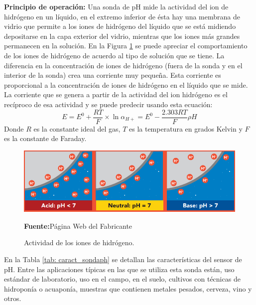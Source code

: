 \textbf{Principio de operación: }Una sonda de pH mide la actividad del ion de hidrógeno en un líquido, en el extremo inferior de ésta hay una membrana de vidrio que permite a los iones de hidrógeno del líquido que se está midiendo depositarse en la capa exterior del vidrio, mientras que los iones más grandes permanecen en la solución. En la Figura \ref{fig:phGrafico} se puede apreciar el comportamiento de los iones de hidrógeno de acuerdo al tipo de solución que se tiene. La diferencia en la concentración de iones de hidrógeno (fuera de la sonda y en el interior de la sonda) crea una corriente muy pequeña. Esta corriente es proporcional a la concentración de iones de hidrógeno en el líquido que se mide.
La corriente que se genera a partir de la actividad del ion hidrógeno es el recíproco de esa actividad y se puede predecir usando esta ecuación:
\begin{equation}
E=E^0 + \frac{RT}{F}\times \ln\alpha_{H+} = E^0 - \frac{2.303RT}{F}\rho H
\label{eq:iv}
\end{equation}
Donde $R$ es la constante ideal del gas, $T$ es la temperatura en grados Kelvin y $F$ es la constante de Faraday.
\newline
\hfill
\begin{figure}[H]
\centering
	\includegraphics[width=\textwidth]{Imagenes/2021/imag22.png}%
	\caption[Actividad de los iones de hidrógeno]{Actividad de los iones de hidrógeno.  }{\textbf{Fuente:}P\'agina Web del Fabricante \cite{atlasph}}
	\label{fig:phGrafico}
\end{figure}

En la Tabla \ref{tab: caract_sondaph} se detallan las características del sensor de pH.
\newline
\hfill
Entre las aplicaciones típicas en las que se utiliza esta sonda están, uso estándar de laboratorio, uso en el campo, en el suelo, cultivos con técnicas de hidropon\'ia o acuapon\'ia, muestras que contienen metales pesados, cerveza, vino y otros.

